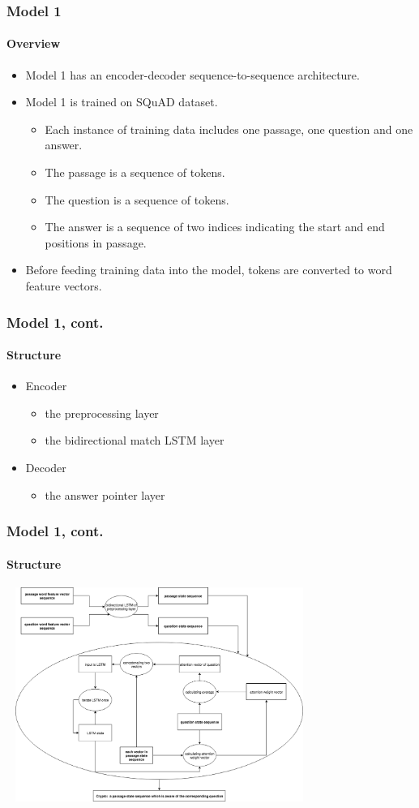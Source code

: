 \documentclass{beamer}
\begin{document}
\begin{frame} \frametitle{Model 1}\framesubtitle{Overview}
  \begin{itemize}
      \item Model 1 has an encoder-decoder sequence-to-sequence architecture.
      \item Model 1 is trained on SQuAD dataset.
            \begin{itemize}
                \item Each instance of training data includes one passage, one question and one answer.
                \item The passage is a sequence of tokens.
                \item The question is a sequence of tokens.
                \item The answer is a sequence of two indices indicating the start and end positions in passage.
            \end{itemize}
      \item Before feeding training data into the model, tokens are converted to word feature vectors.
  \end{itemize}
\end{frame}

\begin{frame} \frametitle{Model 1, cont.}\framesubtitle{Structure}
    \begin{itemize}
        \item Encoder
            \begin{itemize}
                \item the preprocessing layer
                \item the bidirectional match LSTM layer
            \end{itemize}
        \item Decoder
            \begin{itemize}
                \item the answer pointer layer
            \end{itemize}
    \end{itemize}

\end{frame}

\begin{frame} \frametitle{Model 1, cont.}\framesubtitle{Structure}
    \begin{center}
        \includegraphics[width=10cm, height=7cm]{figures/model1_encoder.png}
    \end{center}
\end{frame}
\end{document}
